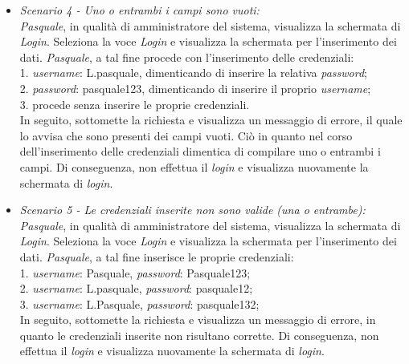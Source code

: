 \begin{itemize}
	\item \textit{Scenario 4 - Uno o entrambi i campi sono vuoti:\\}
	\textit{Pasquale}, in qualità di amministratore del sistema, visualizza la schermata di \textit{Login}. Seleziona la voce \textit{Login} e visualizza la schermata per l’inserimento dei dati. \textit{Pasquale}, a tal fine procede con l’inserimento delle credenziali:\\
	1. \textit{username}: L.pasquale, dimenticando di inserire la relativa \textit{password};\\
	2. \textit{password}: pasquale123, dimenticando di inserire il proprio \textit{username};\\
	3. procede senza inserire le proprie credenziali.\\
	In seguito, sottomette la richiesta e visualizza un messaggio di errore, il quale lo avvisa che sono presenti dei campi vuoti. Ciò in quanto nel corso dell’inserimento delle credenziali dimentica di compilare uno o entrambi i campi. Di conseguenza, non effettua il \textit{login} e visualizza nuovamente la schermata di \textit{login}.\\
	
	\item \textit{Scenario 5 - Le credenziali inserite non sono valide (una o entrambe):\\}
	\textit{Pasquale}, in qualità di amministratore del sistema, visualizza la schermata di \textit{Login}. Seleziona la voce \textit{Login} e visualizza la schermata per l’inserimento dei dati. \textit{Pasquale}, a tal fine inserisce le proprie credenziali:\\
	1. \textit{username}: Pasquale, \textit{password}: Pasquale123;\\
	2. \textit{username}: L.pasquale, \textit{password}: pasquale12;\\
	3. \textit{username}: L.Pasquale, \textit{password}: pasquale132;\\
	In seguito, sottomette la richiesta e visualizza un messaggio di errore, in quanto le credenziali inserite non risultano corrette. Di conseguenza, non effettua il \textit{login} e visualizza nuovamente la schermata di \textit{login}.\\
\end{itemize}

